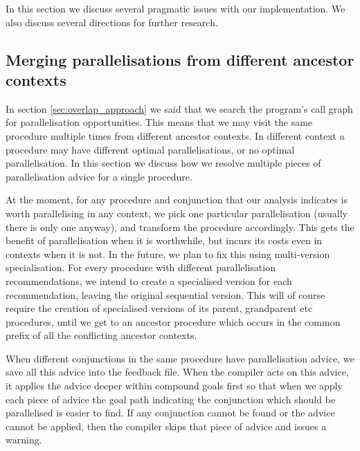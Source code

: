 
In this section we discuss several pragmatic issues with our implementation.
We also discuss several directions for further research.



\subsection{Merging parallelisations from different ancestor contexts}
\label{sec:overlap_pragma_merge}

In section \ref{sec:overlap_approach} we said that we search the program's
call graph for parallelisation opportunities.
This means that we may visit the same procedure multiple times from
different ancestor contexts.
In different context a procedure may have different optimal
parallelisations,
or no optimal parallelisation.
In this section we discuss how we resolve multiple pieces of parallelisation
advice for a single procedure.

At the moment, for any procedure and conjunction
that our analysis indicates is worth parallelising in any context,
we pick one particular parallelisation (usually there is only one anyway),
and transform the procedure accordingly.
This gets the benefit of parallelisation when it is worthwhile,
but incurs its costs even in contexts when it is not.
In the future, we plan to fix this using multi-version specialisation.
For every procedure with different parallelisation recommendations,
we intend to create a specialised version for each recommendation,
leaving the original sequential version.
This will of course require the creation of specialised versions
of its parent, grandparent etc procedures,
until we get to an ancestor procedure
which occurs in the common prefix of all the conflicting ancestor contexts.

When different conjunctions in the same procedure have parallelisation
advice, we save all this advice into the feedback file.
When the compiler acts on this advice,
it applies the advice deeper within compound goals first
so that when we apply each piece of advice the goal path indicating the
conjunction which should be parallelised is easier to find.
If any conjunction cannot be found or the advice cannot be applied,
then the compiler skips that piece of advice and issues a warning.


